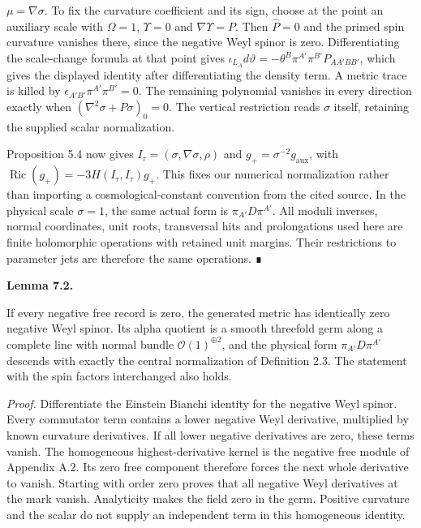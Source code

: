 \documentclass[
  english,
  11pt,
  reqno]{amsart}
\makeatletter
\newcommand{\pandocstatementheading}[1]{%
  \par\addpenalty{\@beginparpenalty}%
  \addvspace{.5\baselineskip plus .2\baselineskip minus .2\baselineskip}%
  {\normalfont\bfseries #1\par}%
  \nobreak\@afterindenttrue\@afterheading
}
\makeatother
\begin{document}
\(\mu=\nabla\sigma\). To fix the curvature coefficient and its sign,
choose at the point an auxiliary scale with \(\Omega=1\), \(\Upsilon=0\)
and \(\nabla\Upsilon=P\). Then \(\widehat P=0\) and the primed spin
curvature vanishes there, since the negative Weyl spinor is zero.
Differentiating the scale-change formula at that point gives
\(\iota_{L_A}d\vartheta=-\theta^B\pi^{A'}\pi^{B'}P_{AA'BB'}\), which
gives the displayed identity after differentiating the density term. A
metric trace is killed by \(\epsilon_{A'B'}\pi^{A'}\pi^{B'}=0\). The
remaining polynomial vanishes in every direction exactly when
\((\nabla^2\sigma+P\sigma)_0=0\). The vertical restriction reads
\(\sigma\) itself, retaining the supplied scalar normalization.

Proposition 5.4 now gives \(I_\tau=(\sigma,\nabla\sigma,\rho)\) and
\(g_+=\sigma^{-2}g_{\mathrm{aux}}\), with
\(\operatorname{Ric}(g_+)=-3H(I_\tau,I_\tau)g_+\). This fixes our
numerical normalization rather than importing a cosmological-constant
convention from the cited source. In the physical scale \(\sigma=1\),
the same actual form is \(\pi_{A'}D\pi^{A'}\). All moduli inverses,
normal coordinates, unit roots, transversal hits and prolongations used
here are finite holomorphic operations with retained unit margins. Their
restrictions to parameter jets are therefore the same operations. ∎

\pandocstatementheading{\protect{}\label{lem:gg-pure-chiral-background}Lemma 7.2.}

If every negative free record is zero, the generated metric has
identically zero negative Weyl spinor. Its alpha quotient is a smooth
threefold germ along a complete line with normal bundle
\(\mathcal O(1)^{\oplus2}\), and the physical form \(\pi_{A'}D\pi^{A'}\)
descends with exactly the central normalization of Definition 2.3. The
statement with the spin factors interchanged also holds.

\emph{Proof.} Differentiate the Einstein Bianchi identity for the
negative Weyl spinor. Every commutator term contains a lower negative
Weyl derivative, multiplied by known curvature derivatives. If all lower
negative derivatives are zero, these terms vanish. The homogeneous
highest-derivative kernel is the negative free module of Appendix A.2.
Its zero free component therefore forces the next whole derivative to
vanish. Starting with order zero proves that all negative Weyl
derivatives at the mark vanish. Analyticity makes the field zero in the
germ. Positive curvature and the scalar do not supply an independent
term in this homogeneous identity.
\end{document}
